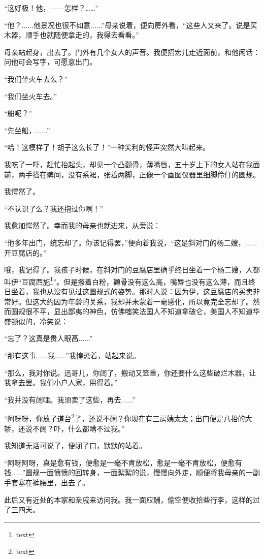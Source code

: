\documentclass[12pt,UTF8]{ctexbook}
\begin{document}
“这好极！他，——怎样？……”

“他？......他景况也很不如意......”母亲说着，便向房外看，“这些人又来了。说是买木器，顺手也就随便拿走的，我得去看看。”

母亲站起身，出去了。门外有几个女人的声音。我便招宏儿走近面前，和他闲话：问他可会写字，可愿意出门。

“我们坐火车去么？”

“我们坐火车去。”

“船呢？”

“先坐船，......”

“哈！这模样了！胡子这么长了！”一种尖利的怪声突然大叫起来。

我吃了一吓，赶忙抬起头，却见一个凸颧骨，薄嘴唇，五十岁上下的女人站在我面前，两手搭在髀间，没有系裙，张着两脚，正像一个画图仪器里细脚伶仃的圆规。

我愕然了。

“不认识了么？我还抱过你咧！”

我愈加愕然了。幸而我的母亲也就进来，从旁说：

“他多年出门，统忘却了。你该记得罢，”便向着我说，“这是斜对门的杨二嫂，......开豆腐店的。”

哦，我记得了。我孩子时候，在斜对门的豆腐店里确乎终日坐着一个杨二嫂，人都叫伊“豆腐西施\footnote{text}”。但是擦着白粉，颧骨没有这么高，嘴唇也没有这么薄，而且终日坐着，我也从没有见过这圆规式的姿势。那时人说：因为伊，这豆腐店的买卖非常好。但这大约因为年龄的关系，我却并未蒙着一毫感化，所以竟完全忘却了。然而圆规很不平，显出鄙夷的神色，仿佛嗤笑法国人不知道拿破仑，美国人不知道华盛顿似的，冷笑说：

“忘了？这真是贵人眼高......”

“那有这事......我......”我惶恐着，站起来说。

“那么，我对你说。迅哥儿，你阔了，搬动又笨重，你还要什么这些破烂木器，让我拿去罢。我们小户人家，用得着。”

“我并没有阔哩。我须卖了这些，再去......”

“阿呀呀，你放了道台\footnote{text}了，还说不阔？你现在有三房姨太太；出门便是八抬的大轿，还说不阔？吓，什么都瞒不过我。”

我知道无话可说了，便闭了口，默默的站着。

“阿呀阿呀，真是愈有钱，便愈是一毫不肯放松，愈是一毫不肯放松，便愈有钱......”圆规一面愤愤的回转身，一面絮絮的说，慢慢向外走，顺便将我母亲的一副手套塞在裤腰里，出去了。

此后又有近处的本家和亲戚来访问我。我一面应酬，偷空便收拾些行李，这样的过了三四天。
\end{document}
